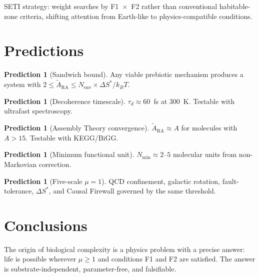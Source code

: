 \documentclass[11pt,a4paper]{article}
\theoremstyle{plain}
\theoremstyle{definition}
\newtheorem{prediction}[theorem]{Prediction}
\theoremstyle{remark}
\begin{document}
SETI strategy: weight searches by F1~$\times$~F2 rather than conventional
habitable-zone criteria, shifting attention from Earth-like to physics-compatible
conditions.

\section{Predictions}\label{sec:predictions}

\begin{prediction}[Sandwich bound]\label{pred:sandwich}
Any viable prebiotic mechanism produces a system with
$2 \leq \tilde{A}_{\mathrm{RA}} \leq N_{\mathrm{env}} \times
\Delta S^*/k_B T$.
\end{prediction}

\begin{prediction}[Decoherence timescale]\label{pred:tau}
$\tau_d \approx 60$~fs at 300~K.  Testable with ultrafast spectroscopy.
\end{prediction}

\begin{prediction}[Assembly Theory convergence]\label{pred:convergence}
$\tilde{A}_{\mathrm{RA}} \approx A$ for molecules with $A > 15$.  Testable
with KEGG/BiGG.
\end{prediction}

\begin{prediction}[Minimum functional unit]\label{pred:nmin}
$N_{\min} \approx 2$--$5$ molecular units from non-Markovian correction.
\end{prediction}

\begin{prediction}[Five-scale $\mu = 1$]\label{pred:five}
QCD confinement, galactic rotation, fault-tolerance, $\Delta S^*$, and Causal
Firewall governed by the same threshold.
\end{prediction}

\section{Conclusions}\label{sec:conclusions}

The origin of biological complexity is a physics problem with a precise answer: life
is possible wherever $\mu \geq 1$ and conditions F1 and F2 are satisfied.  The
answer is substrate-independent, parameter-free, and falsifiable.
\end{document}
